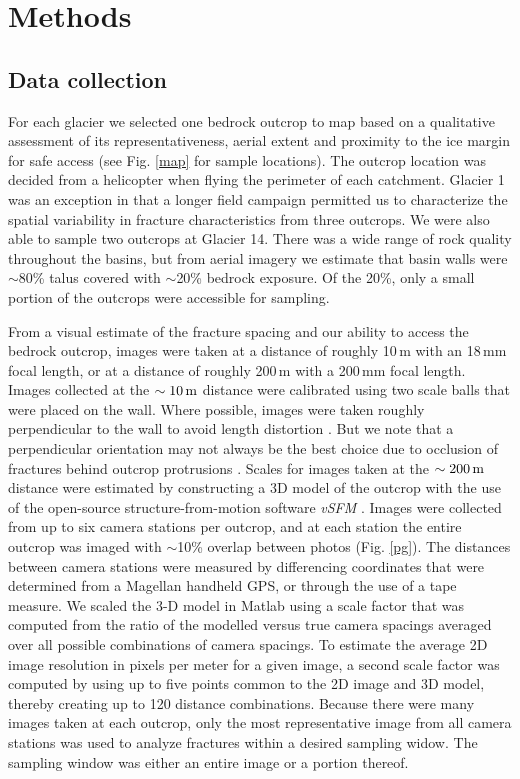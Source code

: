 \documentclass[review]{igs}
\begin{document}
\section{Methods}

\subsection{Data collection}

For each glacier we selected one bedrock outcrop to map based on a qualitative assessment of its representativeness, aerial extent and proximity to the ice margin for safe access (see Fig. \ref{map} for sample locations). The outcrop location was decided from a helicopter when flying the perimeter of each catchment. Glacier 1 was an exception in that a longer field campaign permitted us to characterize the spatial variability in fracture characteristics from three outcrops. We were also able to sample two outcrops at Glacier 14. There was a wide range of rock quality throughout the basins, but from aerial imagery we estimate that basin walls were $\sim$80\% talus covered with $\sim$20\% bedrock exposure. Of the 20\%, only a small portion of the outcrops were accessible for sampling. 

From a visual estimate of the fracture spacing and our ability to access the bedrock outcrop, images were taken at a distance of roughly 10\,m with an 18\,mm focal length, or at a distance of roughly 200\,m with a 200\,mm focal length. Images collected at the $\rm \sim 10\,m$ distance were calibrated using two scale balls that were placed on the wall. Where possible, images were taken roughly perpendicular to the wall to avoid length distortion \citep{Priest2012}. But we note that a perpendicular orientation may not always be the best choice due to occlusion of fractures behind outcrop protrusions \citep[e.g.][]{Sturzenegger2009}. Scales for images taken at the $\rm \sim 200\,m$ distance were estimated by constructing a 3D model of the outcrop with the use of the open-source structure-from-motion software \emph{vSFM} \citep{Wu2011}. Images were collected from up to six camera stations per outcrop, and at each station the entire outcrop was imaged with $\sim$10\% overlap between photos (Fig. \ref{pg}). The distances between camera stations were measured by differencing coordinates that were determined from a Magellan handheld GPS, or through the use of a tape measure. We scaled the 3-D model in Matlab using a scale factor that was computed from the ratio of the modelled versus true camera spacings averaged over all possible combinations of camera spacings. To estimate the average 2D image resolution in pixels per meter for a given image, a second scale factor was computed by using up to five points common to the 2D image and 3D model, thereby creating up to 120 distance combinations. Because there were many images taken at each outcrop, only the most representative image from all camera stations was used to analyze fractures within a desired sampling widow. The sampling window was either an entire image or a portion thereof. 
\end{document}
